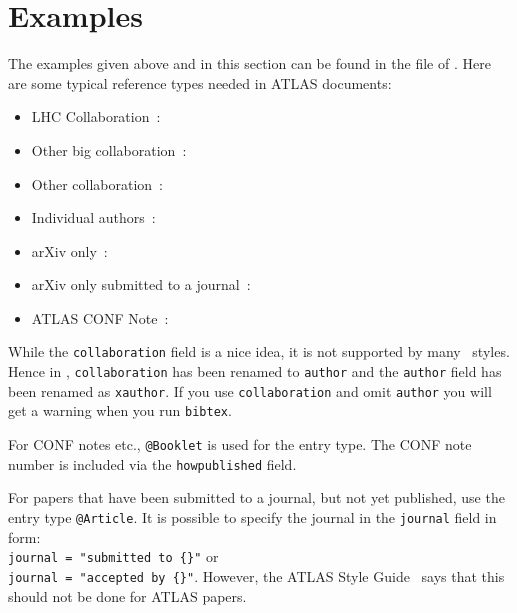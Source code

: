\documentclass[UKenglish, texlive=2016]{\ATLASLATEXPATH atlasdoc}
\begin{document}
\section{Examples}
\label{sec:example}

The examples given above and in this section can be found in the file 
of .
Here are some typical reference types needed in ATLAS documents:
\begin{itemize}
\item LHC Collaboration~\cite{lhcCollaboration:2012}:
  
\item Other big collaboration~\cite{tevatronCollaboration:1995}:
  
\item Other collaboration~\cite{otherCollaboration:2007}:
  
\item Individual authors~\cite{authors:2008}:
  
\item arXiv only~\cite{arxivOnly:2009}:
  
\item arXiv only submitted to a journal~\cite{arxivSub:2011}:
  
\item ATLAS CONF Note~\cite{ATLAS-CONF-2012-058-test}:
  
\end{itemize}

While the \texttt{collaboration} field is a nice idea, it is not supported by many \BibTeX\ styles.
Hence in , \texttt{collaboration} has been renamed to \texttt{author} and
the \texttt{author} field has been renamed as \texttt{xauthor}. If you use \texttt{collaboration} and omit
\texttt{author} you will get a warning when you run \texttt{bibtex}.

For CONF notes etc., \texttt{@Booklet} is used for the entry type.
The CONF note number is included via the \texttt{howpublished} field.

For papers that have been submitted to a journal, but not yet published, use the entry type \texttt{@Article}.
It is possible to specify the journal in the \texttt{journal} field in form:\\
\texttt{journal = "submitted to \{\}"} or\\
\texttt{journal = "accepted by \{\}"}.
However, the ATLAS Style Guide~\cite{atlas-style} says that this should not be done for ATLAS papers.
\end{document}
